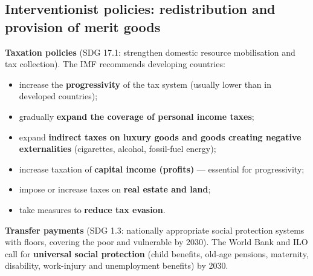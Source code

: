 \documentclass[a4paper,12pt]{article}
\begin{document}
\subsection{Interventionist policies: redistribution and provision of merit goods}
\textbf{Taxation policies} (SDG 17.1: strengthen domestic resource mobilisation and tax collection). The IMF recommends developing countries:
\begin{itemize}
  \item increase the \textbf{progressivity} of the tax system (usually lower than in developed countries);
  \item gradually \textbf{expand the coverage of personal income taxes};
  \item expand \textbf{indirect taxes on luxury goods and goods creating negative externalities} (cigarettes, alcohol, fossil-fuel energy);
  \item increase taxation of \textbf{capital income (profits)} --- essential for progressivity;
  \item impose or increase taxes on \textbf{real estate and land};
  \item take measures to \textbf{reduce tax evasion}.
\end{itemize}
\textbf{Transfer payments} (SDG 1.3: nationally appropriate social protection systems with floors, covering the poor and vulnerable by 2030). The World Bank and ILO call for \textbf{universal social protection} (child benefits, old-age pensions, maternity, disability, work-injury and unemployment benefits) by 2030.
\end{document}

